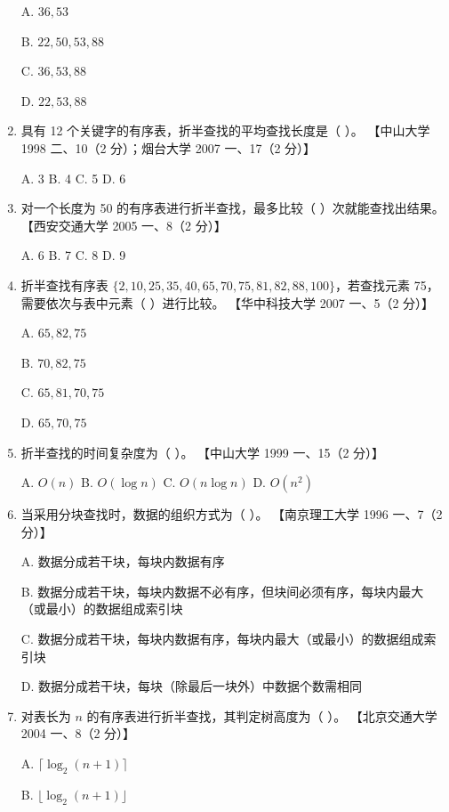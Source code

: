\documentclass[lang=cn,newtx,10pt,scheme=chinese]{elegantbook}
\begin{document}
\begin{enumerate}
    A. $36, 53$  

    B. $22, 50, 53, 88$  

    C. $36, 53, 88$  

    D. $22, 53, 88$  

    \item 具有 12 个关键字的有序表，折半查找的平均查找长度是（ ）。  
    【中山大学 1998 二、10（2 分）；烟台大学 2007 一、17（2 分）】  

    A. 3 \quad B. 4 \quad C. 5 \quad D. 6  

    \item 对一个长度为 50 的有序表进行折半查找，最多比较（ ）次就能查找出结果。  
    【西安交通大学 2005 一、8（2 分）】  

    A. 6 \quad B. 7 \quad C. 8 \quad D. 9  

    \item 折半查找有序表 $\{2, 10, 25, 35, 40, 65, 70, 75, 81, 82, 88, 100\}$，若查找元素 75，需要依次与表中元素（ ）进行比较。  
    【华中科技大学 2007 一、5（2 分）】  

    A. $65, 82, 75$  

    B. $70, 82, 75$  

    C. $65, 81, 70, 75$  

    D. $65, 70, 75$  

    \item 折半查找的时间复杂度为（ ）。  
    【中山大学 1999 一、15（2 分）】  

    A. $O(n)$ \quad B. $O(\log n)$ \quad C. $O(n \log n)$ \quad D. $O(n^2)$  

    \item 当采用分块查找时，数据的组织方式为（ ）。  
    【南京理工大学 1996 一、7（2 分）】  

    A. 数据分成若干块，每块内数据有序  

    B. 数据分成若干块，每块内数据不必有序，但块间必须有序，每块内最大（或最小）的数据组成索引块  

    C. 数据分成若干块，每块内数据有序，每块内最大（或最小）的数据组成索引块  

    D. 数据分成若干块，每块（除最后一块外）中数据个数需相同  

    \item 对表长为 $n$ 的有序表进行折半查找，其判定树高度为（ ）。  
    【北京交通大学 2004 一、8（2 分）】  

    A. $\lceil \log_2(n+1) \rceil$  

    B. $\lfloor \log_2(n+1) \rfloor$  


\end{enumerate}
\end{document}
